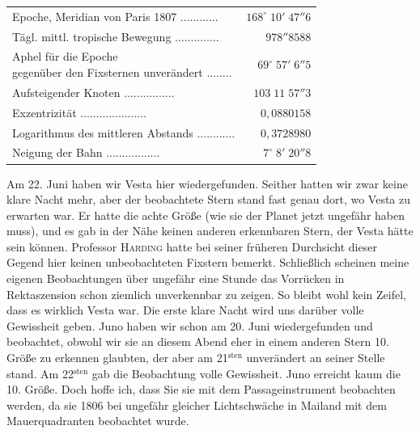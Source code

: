 \begin{center}\fontsize{9}{11}\selectfont\setlength{\tabcolsep}{3pt}\renewcommand{\arraystretch}{1.15}\begin{tabular}{lr}
Epoche, Meridian von Paris 1807 .\;.\;.\;.\;.\;.\;.\;.\;.\;.\;.\;.\; & $168^\circ\;10'\;47''6$\\
Tägl. mittl. tropische Bewegung .\;.\;.\;.\;.\;.\;.\;.\;.\;.\;.\;.\;.\;.\; & $978''8588$\\
\shortstack[l]{Aphel für die Epoche\\gegenüber den Fixsternen unverändert} .\;.\;.\;.\;.\;.\;.\;.\; & $69^\circ\;57'\;6''5$\\
Aufsteigender Knoten .\;.\;.\;.\;.\;.\;.\;.\;.\;.\;.\;.\;.\;.\;.\;.\; & $103\;11\;57''3$\\
Exzentrizität .\;.\;.\;.\;.\;.\;.\;.\;.\;.\;.\;.\;.\;.\;.\;.\;.\;.\;.\;.\;.\; & $0{,}0880158$\\
Logarithmus des mittleren Abstands .\;.\;.\;.\;.\;.\;.\;.\;.\;.\;.\;.\; & $0{,}3728980$\\
Neigung der Bahn .\;.\;.\;.\;.\;.\;.\;.\;.\;.\;.\;.\;.\;.\;.\;.\;.\; & $7^\circ\;8'\;20''8$\\
\end{tabular}\end{center}


\par\indent Am 22. Juni haben wir Vesta hier wiedergefunden. Seither hatten wir zwar keine klare Nacht mehr, aber der beobachtete Stern stand fast genau dort, wo Vesta zu erwarten war. Er hatte die achte Größe (wie sie der Planet jetzt ungefähr haben muss), und es gab in der Nähe keinen anderen erkennbaren Stern, der Vesta hätte sein können. Professor \textsc{Harding} hatte bei seiner früheren Durchsicht dieser Gegend hier keinen unbeobachteten Fixstern bemerkt. Schließlich scheinen meine eigenen Beobachtungen über ungefähr eine Stunde das Vorrücken in Rektaszension schon ziemlich unverkennbar zu zeigen. So bleibt wohl kein Zeifel, dass es wirklich Vesta war. Die erste klare Nacht wird uns darüber volle Gewissheit geben. Juno haben wir schon am 20. Juni wiedergefunden und beobachtet, obwohl wir sie an diesem Abend eher in einem anderen Stern 10. Größe zu erkennen glaubten, der aber am 21$^{\text{sten}}$ unverändert an seiner Stelle stand. Am 22$^{\text{sten}}$ gab die Beobachtung volle Gewissheit. Juno erreicht kaum die 10. Größe. Doch hoffe ich, dass Sie sie mit dem Passageinstrument beobachten werden, da sie 1806 bei ungefähr gleicher Lichtschwäche in Mailand mit dem Mauerquadranten beobachtet wurde.

